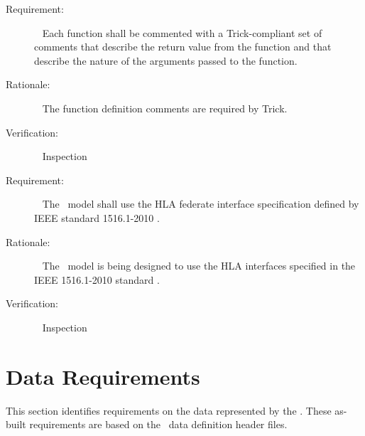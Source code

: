 \documentclass[twoside,11pt,titlepage]{report}
\begin{document}
\label{reqt:func_trick_comments}
\begin{description}
  \item[Requirement:]\ \newline
    Each function shall be commented with a Trick-compliant
    set of comments that describe the return value from the
    function and that describe the nature of the arguments
    passed to the function.

  \item[Rationale:]\ \newline
    The function definition comments are required by Trick.

  \item[Verification:]\ \newline
    Inspection
\end{description}


\label{reqt:hla_federate_interface}
\begin{description}
  \item[Requirement:]\ \newline
    The \TrickHLA\ model shall use the HLA federate interface
    specification defined by IEEE standard 1516.1-2010 \cite{IEEE1516:API}.

  \item[Rationale:]\ \newline
    The \TrickHLA\ model is being designed to use the HLA interfaces
    specified in the IEEE 1516.1-2010 standard \cite{IEEE1516:API}.

  \item[Verification:]\ \newline
    Inspection
\end{description}



\section{Data Requirements}\label{sec:data_reqts}

This section identifies requirements on the data
represented by the \TrickHLA. These as-built requirements are
based on the \TrickHLA\ data definition header files.
\end{document}
